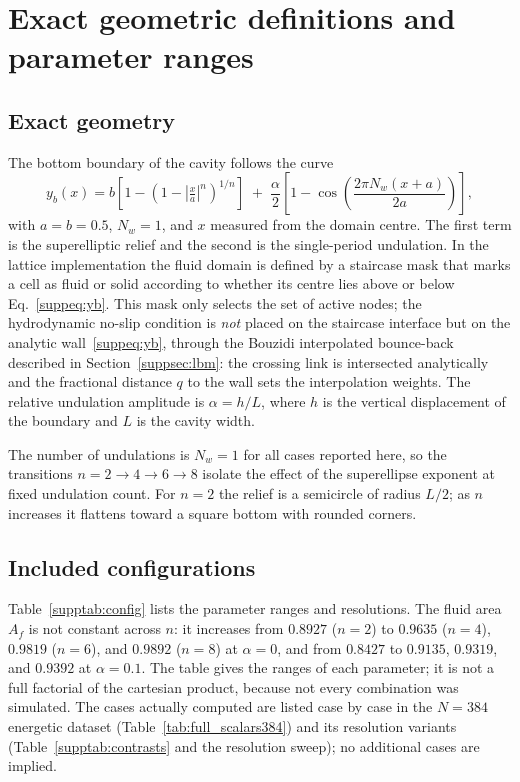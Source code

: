 \section{Exact geometric definitions and parameter ranges}
\label{suppsec:geometry}

\subsection{Exact geometry}

The bottom boundary of the cavity follows the curve
\begin{equation}
y_b(x)= b\left[1-\left(1-\left|\tfrac{x}{a}\right|^{n}\right)^{1/n}\right]
\;+\;\frac{\alpha}{2}\left[1-\cos\!\left(\frac{2\pi N_w (x+a)}{2a}\right)\right],
\label{suppeq:yb}
\end{equation}
with $a=b=0.5$, $N_w=1$, and $x$ measured from the domain centre. The first term is the superelliptic relief and the second is the single-period undulation. In the lattice implementation the fluid domain is defined by a staircase mask that marks a cell as fluid or solid according to whether its centre lies above or below Eq.~\eqref{suppeq:yb}. This mask only selects the set of active nodes; the hydrodynamic no-slip condition is \emph{not} placed on the staircase interface but on the analytic wall~\eqref{suppeq:yb}, through the Bouzidi interpolated bounce-back described in Section~\ref{suppsec:lbm}: the crossing link is intersected analytically and the fractional distance $q$ to the wall sets the interpolation weights. The relative undulation amplitude is $\alpha=h/L$, where $h$ is the vertical displacement of the boundary and $L$ is the cavity width.

The number of undulations is $N_w=1$ for all cases reported here, so the transitions $n=2\rightarrow4\rightarrow6\rightarrow8$ isolate the effect of the superellipse exponent at fixed undulation count. For $n=2$ the relief is a semicircle of radius $L/2$; as $n$ increases it flattens toward a square bottom with rounded corners.

\subsection{Included configurations}

Table~\ref{supptab:config} lists the parameter ranges and resolutions. The fluid area $A_f$ is not constant across $n$: it increases from $0.8927$ ($n=2$) to $0.9635$ ($n=4$), $0.9819$ ($n=6$), and $0.9892$ ($n=8$) at $\alpha=0$, and from $0.8427$ to $0.9135$, $0.9319$, and $0.9392$ at $\alpha=0.1$. The table gives the ranges of each parameter; it is not a full factorial of the cartesian product, because not every combination was simulated. The cases actually computed are listed case by case in the $N=384$ energetic dataset (Table~\ref{tab:full_scalars384}) and its resolution variants (Table~\ref{supptab:contrasts} and the resolution sweep); no additional cases are implied.

